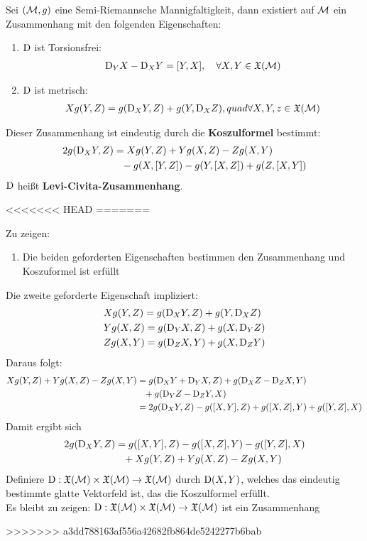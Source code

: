 \begin{satz}
\label{satz:koszulformel}
Sei $(\mathcal{M}, g)$ eine Semi-Riemannsche Mannigfaltigkeit, dann existiert auf $\mathcal{M}$ ein Zusammenhang mit den folgenden Eigenschaften:
\begin{enumerate}
\item $\mathrm{D}$ ist Torsionsfrei:
\begin{align}
\covd_Y X - \covd_X Y = \comm{Y}{X}, \quad \forall X, Y \in \mathfrak{X}(\mfk)
\end{align}
\item $\mathrm{D}$ ist metrisch:
\begin{align}
X g(Y, Z) = g(\mathrm{D}_X Y, Z) + g(Y, \mathrm{D}_X Z), quad \forall X,Y,z \in \mathfrak{X}(\mathcal{M})
\end{align}
\end{enumerate}
Dieser Zusammenhang ist eindeutig durch die \textbf{Koszulformel} bestimmt:
\begin{align}
2 g (\covd_X Y, Z) &= X g(Y, Z) + Y g(X, Z) - Z g(X, Y)\\
&\phantom{=} - g(X, \comm{Y}{Z}) - g(Y, \comm{X}{Z}) + g(Z, \comm{X}{Y})
\end{align}
$\mathrm{D}$ heißt \textbf{Levi-Civita-Zusammenhang}.
\end{satz}

<<<<<<< HEAD
=======
\begin{bew}
Zu zeigen:
\begin{enumerate}
\item Die beiden geforderten Eigenschaften bestimmen den Zusammenhang und Koszuformel ist erfüllt
\end{enumerate}
Die zweite geforderte Eigenschaft impliziert:
\begin{align*}
&X g(Y, Z) = g(\mathrm{D}_X Y, Z) + g(Y, \mathrm{D}_X Z)\\
&Y g(X , Z) = g (\mathrm{D}_Y X, Z) + g(X, \mathrm{D}_Y Z)\\
&Z g(X, Y) = g(\mathrm{D}_Z X, Y) + g(X, \mathrm{D}_Z Y)
\end{align*}
Daraus folgt:
\begin{align*}
X g(Y, Z) + Y g(X , Z) - Z g(X, Y) &= g(\covd_X Y + \covd_Y X, Z) + g(\covd_X Z - \covd_Z X , Y)\\
 & \phantom{=}+ g(\covd_Y Z - \covd_Z Y, X) \\
 &= 2 g(\covd_X Y, Z) - g(\comm{X}{Y}, Z) + g(\comm{X}{Z}, Y) + g(\comm{Y}{Z}, X)
\end{align*}
Damit ergibt sich
\begin{align}
2 g(\covd_X Y, Z) &= g(\comm{X}{Y}, Z) - g(\comm{X}{Z}, Y) - g(\comm{Y}{Z}, X)\\
&\phantom{=} + X g(Y, Z) + Y g(X, Z) - Z g(X, Y)
\end{align}
Definiere $\mathrm{D} : \mathfrak{X}(\mathcal{M}) \times \mathfrak{X}(\mathcal{M}) \to \mathfrak{X}(\mathcal{M})$
durch $\mathrm{D} (X, Y)$, welches das eindeutig bestimmte glatte Vektorfeld ist, das die Koszulformel erfüllt.\\
Es bleibt zu zeigen:
$\mathrm{D} : \mathfrak{X}(\mathcal{M}) \times \mathfrak{X}(\mathcal{M}) \to \mathfrak{X}(\mathcal{M}) $ ist ein Zusammenhang

\end{bew}

>>>>>>> a3dd788163af556a42682fb864de5242277b6bab
